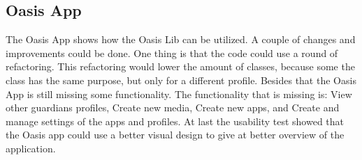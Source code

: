 \subsection{Oasis App}
The Oasis App shows how the Oasis Lib can be utilized. A couple of changes and improvements could be done. One thing is that the code could use a round of refactoring. This refactoring would lower the amount of classes, because some the class has the same purpose, but only for a different profile. Besides that the Oasis App is still missing some functionality. The functionality that is missing is: View other guardians profiles, Create new media, Create new apps, and Create and manage settings of the apps and profiles. At last the usability test showed that the Oasis app could use a better visual design to give at better overview of the application.
